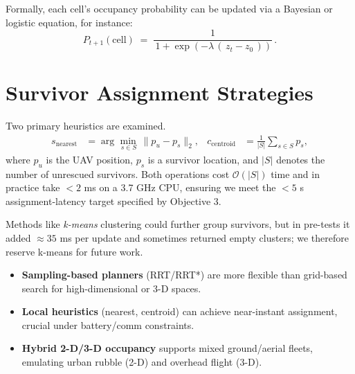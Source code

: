 \documentclass[12pt,a4paper]{report}
\begin{document}
Formally, each cell’s occupancy probability can be updated via a Bayesian or logistic 
equation, for instance:
\begin{equation}
P_{t+1}(\text{cell}) \;=\; \frac{1}{\,1 + \exp(-\lambda\, (\,z_t - z_0\,))}\,.
\end{equation}

\section{Survivor Assignment Strategies}
\label{sec:survivor_assignment}

Two primary heuristics are examined.  %
\begin{align}
s_{\mathrm{nearest}} &= \arg\min_{\,s \in S}\, \lVert p_u - p_s\rVert_2,
                      & %
c_{\mathrm{centroid}} &= \frac{1}{\lvert S\rvert}\sum_{s \in S} p_s ,
\end{align}
where $p_u$ is the UAV position, $p_s$ is a survivor location, and
$\lvert S\rvert$ denotes the number of unrescued survivors.  Both operations cost
$\mathcal{O}(\lvert S\rvert)$ time and in practice take $<2$ ms on a 3.7 GHz CPU, 
ensuring we meet the $<5$ s assignment-latency target specified by Objective 3.

Methods like \emph{k-means} clustering \cite{Dias2006MarketBased} could further group survivors, but in
pre-tests it added $\approx35$ ms per update and sometimes returned empty clusters; we
therefore reserve k-means for future work.

\vspace{0.7em}
\begin{tcolorbox}[colback=gray!10,title=\textbf{Take-away 2.1}]
\begin{itemize}[leftmargin=1.2em]
\item \textbf{Sampling-based planners} (RRT/RRT*) are more flexible than grid-based search for high-dimensional or 3-D spaces.
\item \textbf{Local heuristics} (nearest, centroid) can achieve near-instant assignment, crucial under battery/comm constraints.
\item \textbf{Hybrid 2-D/3-D occupancy} supports mixed ground/aerial fleets, emulating urban rubble (2-D) and overhead flight (3-D).
\end{itemize}
\end{tcolorbox}
\end{document}
